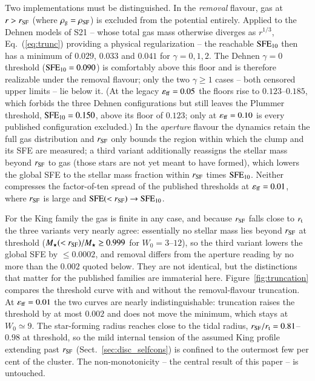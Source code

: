 \documentclass{aa}
\newcommand{\sfe}{{\rm SFE}}
\newcommand{\rtid}{r_{\rm t}}
\newcommand{\rsf}{r_{\rm SF}}
\newcommand{\effE}{\varepsilon_{\rm ff}}
\begin{document}
Two implementations must be distinguished. In the \emph{removal} flavour,
gas at $r>\rsf$ (where $\rho_{\rm g}=\rho_{\rm SF}$) is excluded from the
potential entirely. Applied to the Dehnen models of S21 -- whose total
gas mass otherwise diverges as $r^{1/3}$, Eq.~(\ref{eq:trunc}) providing
a physical regularization -- the reachable $\sfe_{10}$ then has a minimum
of $0.029$, $0.033$ and $0.041$ for $\gamma=0,1,2$. The Dehnen
$\gamma=0$ threshold ($\sfe_{10}=0.090$) is comfortably above this floor
and is therefore realizable under the removal flavour; only the two
$\gamma\ge1$ cases -- both censored upper limits -- lie below it. (At
the legacy $\effE=0.05$ the floors rise to $0.123$--$0.185$, which
forbids the three Dehnen configurations but still leaves the Plummer
threshold, $\sfe_{10}=0.150$, above its floor of $0.123$; only at
$\effE=0.10$ is every published configuration excluded.) In the \emph{aperture} flavour the
dynamics retain the full gas distribution and $\rsf$ only bounds the
region within which the clump and its SFE are measured; a third variant
additionally reassigns the stellar mass beyond $\rsf$ to gas (those
stars are not yet meant to have formed), which lowers the global SFE to
the stellar mass fraction within $\rsf$ times $\sfe_{10}$. Neither
compresses the factor-of-ten spread of the published thresholds at
$\effE=0.01$, where $\rsf$ is large and $\sfe(<\rsf)\rightarrow\sfe_{10}$.

For the King family the gas is finite in any case, and because $\rsf$
falls close to $\rtid$ the three variants very nearly agree: essentially
no stellar mass lies beyond $\rsf$ at threshold
($M_\star(<\rsf)/M_\star\ge0.999$ for $W_0=3$--$12$), so the third
variant lowers the global SFE by $\le0.0002$, and removal differs from
the aperture reading by no more than the $0.002$ quoted below. They are
not identical, but the distinctions that matter for the published
families are immaterial here. Figure~\ref{fig:truncation} compares the
threshold curve with and without the removal-flavour truncation. At $\effE=0.01$ the two curves are
nearly indistinguishable: truncation raises the threshold by at most
$0.002$ and does not move the minimum, which stays at $W_0\simeq9$. The
star-forming radius reaches close to the tidal radius,
$\rsf/\rtid=0.81$--$0.98$ at threshold, so the mild internal tension of
the assumed King profile extending past $\rsf$
(Sect.~\ref{sec:disc_selfcons}) is confined to the outermost few per
cent of the cluster. The non-monotonicity -- the central result of this
paper -- is untouched.
\end{document}
